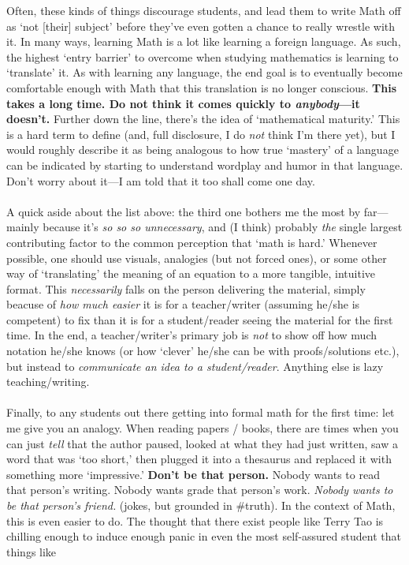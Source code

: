 \documentclass[10pt]{article}
\theoremstyle{definition}
\begin{document}
Often, these kinds of things discourage students, and lead them to write Math off as `not [their] subject' before they've even gotten a chance to really wrestle with it.  In many ways, learning Math is a lot like learning a foreign language.  As such, the highest `entry barrier' to overcome when studying mathematics is learning to `translate' it.  As with learning any language, the end goal is to eventually become comfortable enough with Math that this translation is no longer conscious.  \textbf{This takes a long time.  Do not think it comes quickly to \emph{anybody}---it doesn't.}  Further down the line, there's the idea of `mathematical maturity.'  This is a hard term to define (and, full disclosure, I do \emph{not} think I'm there yet), but I would roughly describe it as being analogous to how true `mastery' of a language can be indicated by starting to understand wordplay and humor in that language.  Don't worry about it---I am told that it too shall come one day.\\~\\
A quick aside about the list above: the third one bothers me the most by far---mainly because it's \emph{so so so unnecessary}, and (I think) probably \emph{the} single largest contributing factor to the common perception that `math is hard.'  Whenever possible, one should use visuals, analogies (but not forced ones), or some other way of `translating' the meaning of an equation to a more tangible, intuitive format.  This \emph{necessarily} falls on the person delivering the material, simply beacuse of \emph{how much easier} it is for a teacher/writer (assuming he/she is competent) to fix than it is for a student/reader seeing the material for the first time.  In the end, a teacher/writer's primary job is \emph{not} to show off how much notation he/she knows (or how `clever' he/she can be with proofs/solutions etc.), but instead to \emph{communicate an idea to a student/reader}.  Anything else is lazy teaching/writing.  \\~\\
Finally, to any students out there getting into formal math for the first time: let me give you an analogy.  When reading papers / books, there are times when you can just \emph{tell} that the author paused, looked at what they had just written, saw a word that was `too short,' then plugged it into a thesaurus and replaced it with something more `impressive.'  \textbf{Don't be that person.}  Nobody wants to read that person's writing.  Nobody wants grade that person's work.  \emph{Nobody wants to be that person's friend.} (jokes, but grounded in \#truth).  In the context of Math, this is even easier to do.  The thought that there exist people like Terry Tao is chilling enough to induce enough panic in even the most self-assured student that things like 
\end{document}
